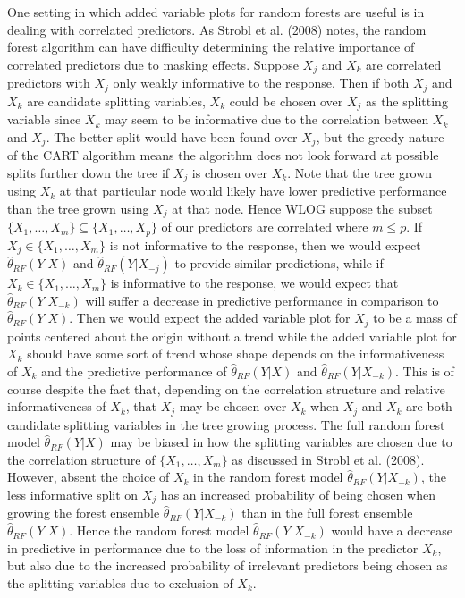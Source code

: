 \documentclass[12pt,twoside]{reedthesis}
\theoremstyle{definition}
\theoremstyle{definition}
\theoremstyle{definition}
\theoremstyle{remark}
\begin{document}
One setting in which added variable plots for random forests are useful
is in dealing with correlated predictors. As Strobl et al. (2008) notes,
the random forest algorithm can have difficulty determining the relative
importance of correlated predictors due to masking effects. Suppose
\(X_j\) and \(X_k\) are correlated predictors with \(X_j\) only weakly
informative to the response. Then if both \(X_j\) and \(X_k\) are
candidate splitting variables, \(X_k\) could be chosen over \(X_j\) as
the splitting variable since \(X_k\) may seem to be informative due to
the correlation between \(X_k\) and \(X_j\). The better split would have
been found over \(X_j\), but the greedy nature of the CART algorithm
means the algorithm does not look forward at possible splits further
down the tree if \(X_j\) is chosen over \(X_k\). Note that the tree
grown using \(X_k\) at that particular node would likely have lower
predictive performance than the tree grown using \(X_j\) at that node.
Hence WLOG suppose the subset
\(\{X_1,\ldots,X_m\}\subseteq \{X_1,\ldots,X_p\}\) of our predictors are
correlated where \(m\leq p\). If \(X_j\in \{X_1,\ldots,X_m\}\) is not
informative to the response, then we would expect
\(\hat{\theta}_{RF}(Y|X)\) and \(\hat{\theta}_{RF}(Y|X_{-j})\) to
provide similar predictions, while if \(X_k\in \{X_1,\ldots,X_m\}\) is
informative to the response, we would expect that
\(\hat{\theta}_{RF}(Y|X_{-k})\) will suffer a decrease in predictive
performance in comparison to \(\hat{\theta}_{RF}(Y|X)\). Then we would
expect the added variable plot for \(X_j\) to be a mass of points
centered about the origin without a trend while the added variable plot
for \(X_k\) should have some sort of trend whose shape depends on the
informativeness of \(X_k\) and the predictive performance of
\(\hat{\theta}_{RF}(Y|X)\) and \(\hat{\theta}_{RF}(Y|X_{-k})\). This is
of course despite the fact that, depending on the correlation structure
and relative informativeness of \(X_k\), that \(X_j\) may be chosen over
\(X_k\) when \(X_j\) and \(X_k\) are both candidate splitting variables
in the tree growing process. The full random forest model
\(\hat{\theta}_{RF}(Y|X)\) may be biased in how the splitting variables
are chosen due to the correlation structure of \(\{X_1,\ldots,X_m\}\) as
discussed in Strobl et al. (2008). However, absent the choice of \(X_k\)
in the random forest model \(\hat{\theta}_{RF}(Y|X_{-k})\), the less
informative split on \(X_j\) has an increased probability of being
chosen when growing the forest ensemble \(\hat{\theta}_{RF}(Y|X_{-k})\)
than in the full forest ensemble \(\hat{\theta}_{RF}(Y|X)\). Hence the
random forest model \(\hat{\theta}_{RF}(Y|X_{-k})\) would have a
decrease in predictive in performance due to the loss of information in
the predictor \(X_k\), but also due to the increased probability of
irrelevant predictors being chosen as the splitting variables due to
exclusion of \(X_k\). \par  
\end{document}
